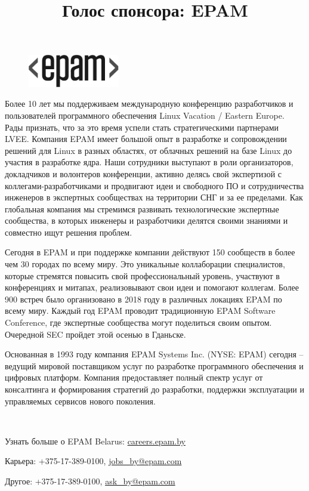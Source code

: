 \documentclass[10pt, a5paper]{article}
\begin{document}
\title{Голос спонсора: EPAM}
\date{}
\maketitle%
 
\begin{center}
\begin{figure}[h!]
  \centering
  \includegraphics[width=4cm]{epam_logo}
\end{figure}
\end{center} 

\small

Более 10 лет мы поддерживаем международную конференцию разработчиков и пользователей программного обеспечения Linux Vacation / Eastern Europe. Рады признать, что за это время успели стать стратегическими партнерами LVEE. Компания EPAM имеет большой опыт в разработке и сопровождении решений для Linux в разных областях, от облачных решений на базе Linux до участия в разработке ядра. Наши сотрудники выступают в роли организаторов, докладчиков и волонтеров конференции, активно делясь свой экспертизой с коллегами-разработчиками и продвигают идеи и свободного ПО и сотрудничества инженеров в экспертных сообществах на территории СНГ и за ее пределами.  Как глобальная компания мы стремимся развивать технологические экспертные сообщества, в которых инженеры и разработчики делятся своими знаниями и совместно ищут решения проблем.  

Сегодня в EPAM и при поддержке компании действуют 150 сообществ в более чем 30 городах по всему миру. Это уникальные коллаборации специалистов, которые стремятся повысить свой профессиональный уровень,
участвуют в конференциях и митапах, реализовывают свои идеи и помогают коллегам. Более 900 встреч было организовано в 2018 году в различных локациях EPAM по всему миру. Каждый год EPAM проводит традиционную EPAM Software Conference, где экспертные сообщества могут поделиться своим опытом. Очередной SEC пройдет этой осенью в Гданьске.

Основанная в 1993 году компания EPAM Systems Inc. (NYSE: EPAM) сегодня – ведущий мировой поставщиком услуг по разработке программного обеспечения и цифровых платформ. Компания предоставляет полный спектр услуг от консалтинга и формирования стратегий до разработки, поддержки эксплуатации и управляемых сервисов нового поколения.  

~

Узнать больше о EPAM Belarus: \url{careers.epam.by}

Карьера: +375-17-389-0100, \url{jobs_by@epam.com}

Другое: +375-17-389-0100, \url{ask_by@epam.com }


\end{document}
